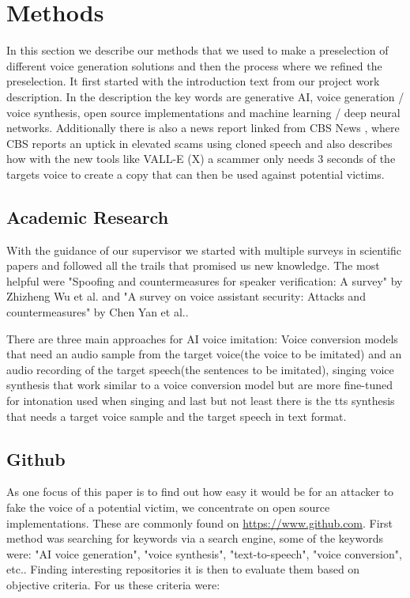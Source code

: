 \newpage
\section{Methods} \label{methods}

In this section we describe our methods that we used to make a preselection of different voice generation solutions and then the process where we refined the preselection.
It first started with the introduction text from our project work description. In the description the key words are generative AI, voice generation / voice synthesis, open source implementations and machine learning / deep neural networks. Additionally there is also a news report linked from CBS News \cite{cbsnews2023voice}, where CBS reports an uptick in elevated scams using cloned speech and also describes how with the new tools like VALL-E (X) a scammer only needs 3 seconds of the targets voice to create a copy that can then be used against potential victims.

\subsection{Academic Research}

With the guidance of our supervisor we started with multiple surveys in scientific papers and followed all the trails that promised us new knowledge. The most helpful were "Spoofing and countermeasures for speaker verification: A survey" by Zhizheng Wu et al.\cite{wu2015spoofing} and "A survey on voice assistant security: Attacks and countermeasures" by Chen Yan et al.\cite{yan2022survey}.

There are three main approaches for AI voice imitation: Voice conversion models that need an audio sample from the target voice(the voice to be imitated) and an audio recording of the target speech(the sentences to be imitated), singing voice synthesis that work similar to a voice conversion model but are more fine-tuned for intonation used when singing and last but not least there is the \gls{tts} synthesis that needs a target voice sample and the target speech in text format\cite{wu2015spoofing}.

\subsection{Github} \label{github_method}

As one focus of this paper is to find out how easy it would be for an attacker to fake the voice of a potential victim, we concentrate on open source implementations. These are commonly found on \url{https://www.github.com}. First method was searching for keywords via a search engine, some of the keywords were: "AI voice generation", "voice synthesis", "text-to-speech", "voice conversion", etc.. Finding interesting repositories it is then to evaluate them based on objective criteria. For us these criteria were:

